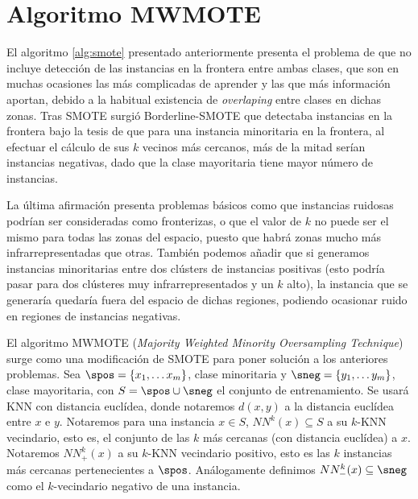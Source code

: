 \section{Algoritmo MWMOTE}
El algoritmo \ref{alg:smote} presentado anteriormente presenta el problema de que no incluye detección de
las instancias en la frontera entre ambas clases, que son en muchas ocasiones las más complicadas de aprender y las que más
información aportan, debido a la habitual existencia de \textit{overlaping} entre clases en dichas zonas. Tras SMOTE surgió
Borderline-SMOTE que detectaba instancias en la frontera bajo la tesis de que para una instancia minoritaria en la frontera,
al efectuar el cálculo de sus $k$ vecinos más cercanos, más de la mitad serían instancias negativas, dado que la
clase mayoritaria tiene mayor número de instancias.

La última afirmación presenta problemas básicos como que instancias ruidosas podrían ser consideradas como fronterizas, o que
el valor de $k$ no puede ser el mismo para todas las zonas del espacio, puesto que habrá zonas mucho más infrarrepresentadas
que otras. También podemos añadir que si generamos instancias minoritarias entre dos clústers de instancias positivas (esto 
podría pasar para dos clústeres muy infrarrepresentados y un $k$ alto), la instancia que se generaría quedaría fuera del 
espacio de dichas regiones, podiendo ocasionar ruido en regiones de instancias negativas.

El algoritmo MWMOTE (\textit{Majority Weighted Minority Oversampling Technique}) surge como una modificación de SMOTE para poner 
solución a los anteriores problemas. Sea $\spos = \{x_1, \ldots x_m\}$, clase minoritaria y $\sneg = \{y_1, \ldots y_m\}$, 
clase mayoritaria, con $S= \spos \cup \sneg$ el conjunto de entrenamiento. Se usará KNN con distancia euclídea, donde notaremos
$d(x,y)$ a la distancia euclídea entre $x$ e $y$. Notaremos para una instancia $x\in S$, $NN^{k}(x)\subseteq S$ a su $k$-KNN vecindario, 
esto es, el conjunto de las $k$ más cercanas (con distancia euclídea) a $x$. Notaremos $NN_{+}^k(x)$ a su $k$-KNN vecindario 
positivo, esto es las $k$ instancias más cercanas pertenecientes a $\spos$. Análogamente definimos $NN_{-}^k(x) \subseteq \sneg$ 
como el $k$-vecindario negativo de una instancia.

